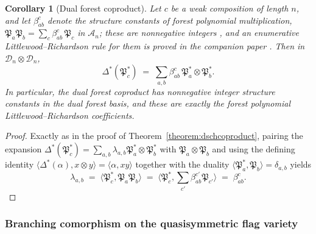 \documentclass{amsart}
\newtheorem{corollary}[lemma]{Corollary}
\theoremstyle{definition}
\theoremstyle{remark}
\numberwithin{equation}{subsection}
\newcommand{\downvar}[1]{\stackrel{#1}{\searrow}}
\newcommand{\dsch}{\ensuremath{\Xi}}
\newcommand{\coma}{\mathcal{A}}
\newcommand{\dcoma}{\mathcal{D}}
\newcommand{\code}{\mathfrak{c}}
\newcommand{\forest}{\mathfrak{P}}
\begin{document}


\begin{corollary}[Dual forest coproduct]\label{corollary:dforestcoproduct}
Let $c$ be a weak composition of length $n$, and let $\beta_{ab}^c$ denote the structure constants of forest polynomial multiplication, $\forest_a\forest_b=\sum_c\beta_{ab}^c\,\forest_c$ in $\coma_n$; these are nonnegative integers \cite{nadeau2024forest,bergeron2025equivariant}, and an enumerative Littlewood--Richardson rule for them is proved in the companion paper \cite{companionforest}. Then in $\dcoma_n\otimes\dcoma_n$,
$$\Delta^*(\forest_c^*) \;=\; \sum_{a,b}\beta_{ab}^c\,\forest_a^*\otimes\forest_b^*.$$
In particular, the dual forest coproduct has nonnegative integer structure constants in the dual forest basis, and these are exactly the forest polynomial Littlewood--Richardson coefficients.
\end{corollary}
\begin{proof}
Exactly as in the proof of Theorem~\ref{theorem:dschcoproduct}, pairing the expansion $\Delta^*(\forest_c^*) = \sum_{a,b}\lambda_{a,b}\forest_a^*\otimes\forest_b^*$ with $\forest_a\otimes\forest_b$ and using the defining identity $\langle\Delta^*(\alpha),x\otimes y\rangle = \langle \alpha, xy\rangle$ together with the duality $\langle \forest_a^*,\forest_b\rangle = \delta_{a,b}$ yields
$$\lambda_{a,b}\;=\;\langle \forest_c^*,\forest_a\forest_b\rangle\;=\;\langle \forest_c^*,\textstyle\sum_{c'}\beta_{ab}^{c'}\forest_{c'}\rangle\;=\;\beta_{ab}^c.$$
\end{proof}

\subsubsection*{Branching comorphism on the quasisymmetric flag variety}\label{subsection:qflbranch}
\end{document}
